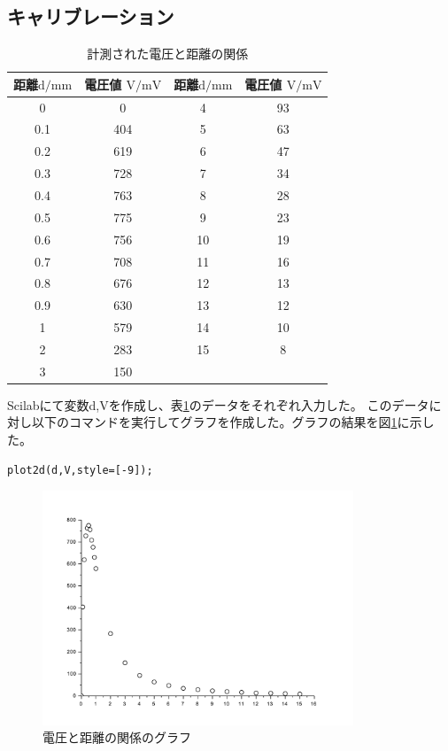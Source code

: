 \documentclass[11pt,a4j]{jsarticle}
\makeatletter
\newcommand{\figcaption}[1]{\def\@captype{figure}\caption{#1}}
\makeatother
\begin{document}
\subsection{キャリブレーション}
\label{sub:キャリブレーション}

\begin{table}[H]
  \caption{計測された電圧と距離の関係}
  \label{tab:caribration}
  \small
  \begin{center}
      \begin{tabular}{cc|cc}
        \hline
        \toprule
        距離$\mathrm{d /mm}$ & 電圧値 $\mathrm{V / mV}$ & 距離$\mathrm{d /mm}$ & 電圧値 $\mathrm{V / mV}$ \\
        \midrule
        0	&	0	&	4	&	93	\\
        0.1	&	404	&	5	&	63	\\
        0.2	&	619	&	6	&	47	\\
        0.3	&	728	&	7	&	34	\\
        0.4	&	763	&	8	&	28	\\
        0.5	&	775	&	9	&	23	\\
        0.6	&	756	&	10	&	19	\\
        0.7	&	708	&	11	&	16	\\
        0.8	&	676	&	12	&	13	\\
        0.9	&	630	&	13	&	12	\\
        1	&	579	&	14	&	10	\\
        2	&	283	&	15	&	8	\\
        3	&	150	\\				 \hline
      \end{tabular}
  \end{center}
\end{table}



Scilabにて変数d,Vを作成し、表\ref{tab:caribration}のデータをそれぞれ入力した。
このデータに対し以下のコマンドを実行してグラフを作成した。グラフの結果を図\ref{fig:fig1}に示した。

\begin{lstlisting}[basicstyle=\ttfamily\footnotesize, frame=single, framesep=0pt]
  plot2d(d,V,style=[-9]);
\end{lstlisting}

\begin{figure}[H]
  \centering
  \includegraphics[height=70mm,bb=0 0 610 480]{image/fig1.pdf}
  \figcaption{電圧と距離の関係のグラフ}
  \label{fig:fig1}
\end{figure}
\end{document}
